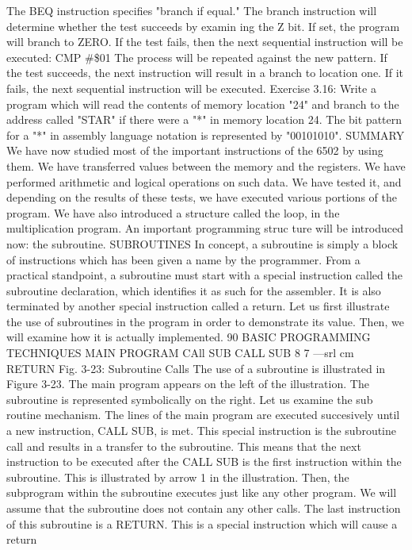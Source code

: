 \documentclass{book}
\begin{document}
The BEQ instruction specifies "branch if equal." The branch
instruction will determine whether the test succeeds by examin
ing the Z bit. If set, the program will branch to ZERO. If the test
fails, then the next sequential instruction will be executed:
CMP #\$01
The process will be repeated against the new pattern. If the test
succeeds, the next instruction will result in a branch to location
one. If it fails, the next sequential instruction will be executed.
Exercise 3.16: Write a program which will read the contents of
memory location "24" and branch to the address called "STAR" if
there were a "*" in memory location 24. The bit pattern for a "*" in
assembly language notation is represented by "00101010".
SUMMARY
We have now studied most of the important instructions of the
6502 by using them. We have transferred values between the
memory and the registers. We have performed arithmetic and
logical operations on such data. We have tested it, and depending
on the results of these tests, we have executed various portions of
the program. We have also introduced a structure called the loop,
in the multiplication program. An important programming struc
ture will be introduced now: the subroutine.
SUBROUTINES
In concept, a subroutine is simply a block of instructions which
has been given a name by the programmer. From a practical
standpoint, a subroutine must start with a special instruction
called the subroutine declaration, which identifies it as such for
the assembler. It is also terminated by another special instruction
called a return. Let us first illustrate the use of subroutines in the
program in order to demonstrate its value. Then, we will examine
how it is actually implemented.
90
BASIC PROGRAMMING TECHNIQUES
MAIN PROGRAM
CAll SUB
CALL SUB
8
7
—srl
cm RETURN
Fig. 3-23: Subroutine Calls
The use of a subroutine is illustrated in Figure 3-23. The main
program appears on the left of the illustration. The subroutine is
represented symbolically on the right. Let us examine the sub
routine mechanism. The lines of the main program are executed
succesively until a new instruction, CALL SUB, is met. This
special instruction is the subroutine call and results in a transfer
to the subroutine. This means that the next instruction to be
executed after the CALL SUB is the first instruction within the
subroutine. This is illustrated by arrow 1 in the illustration.
Then, the subprogram within the subroutine executes just like
any other program. We will assume that the subroutine does not
contain any other calls. The last instruction of this subroutine is a
RETURN. This is a special instruction which will cause a return
\end{document}
